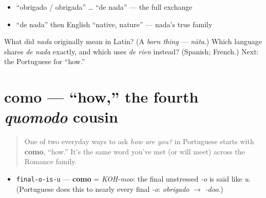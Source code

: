 \begin{itemize}
\raggedright
  \item \textquotedblleft{}obrigado / obrigada\textquotedblright{} … \textquotedblleft{}de nada\textquotedblright{} — the full exchange
  \item \textquotedblleft{}de nada\textquotedblright{} then English \textquotedblleft{}native, nature\textquotedblright{} — nada's true family
\end{itemize}

\begin{tcolorbox}[breakable,colback=teal!4,colframe=teal!35!black,title={Before you move on}]
What did \emph{nada} originally mean in Latin? (A \emph{born thing} — \emph{nāta}.) Which language shares \emph{de nada} exactly, and which uses \emph{de rien} instead? (Spanish; French.) Next: the Portuguese for \textquotedblleft{}how.\textquotedblright{}
\end{tcolorbox}
\section[como]{como — \textquotedblleft{}how,\textquotedblright{} the fourth \emph{quomodo} cousin}

\label{lesson:PT-C02-como}



\begin{quote}
One of two everyday ways to ask \emph{how are you?} in Portuguese starts with \textbf{como}, \textquotedblleft{}how.\textquotedblright{} It's the same word you've met (or will meet) across the Romance family.
\end{quote}

\begin{sounds}
\begin{itemize}
\raggedright
  \item \texttt{final-o-is-u} — \textbf{como} = \emph{KOH-moo}: the final unstressed \emph{-o} is said like \emph{u}. (Portuguese does this to nearly every final \emph{-o}: \emph{obrigado} $\to$ \emph{-doo}.)
\end{itemize}
\end{sounds}


